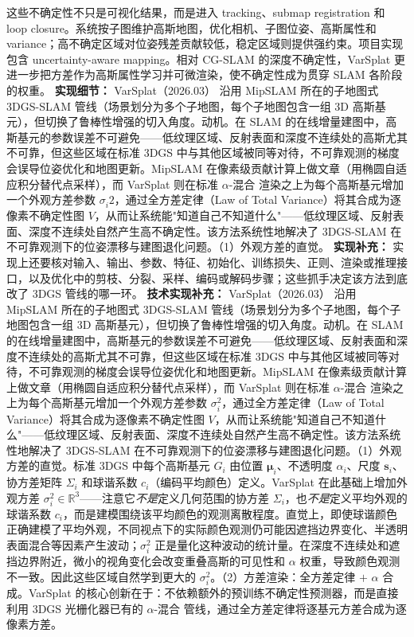 这些不确定性不只是可视化结果，而是进入 tracking、submap registration 和 loop closure。系统按子图维护高斯地图，优化相机、子图位姿、高斯属性和 variance；高不确定区域对位姿残差贡献较低，稳定区域则提供强约束。项目实现包含 uncertainty-aware mapping。相对 CG-SLAM 的深度不确定性，VarSplat 更进一步把方差作为高斯属性学习并可微渲染，使不确定性成为贯穿 SLAM 各阶段的权重。
\textbf{实现细节：} VarSplat（2026.03） 沿用 MipSLAM 所在的子地图式 3DGS-SLAM 管线（场景划分为多个子地图，每个子地图包含一组 3D 高斯基元），但切换了鲁棒性增强的切入角度。动机。在 SLAM 的在线增量建图中，高斯基元的参数误差不可避免——低纹理区域、反射表面和深度不连续处的高斯尤其不可靠，但这些区域在标准 3DGS 中与其他区域被同等对待，不可靠观测的梯度会误导位姿优化和地图更新。MipSLAM 在像素级贡献计算上做文章（用椭圆自适应积分替代点采样），而 VarSplat 则在标准 $\alpha$-混合 渲染之上为每个高斯基元增加一个外观方差参数 $\sigma_i^{}2$，通过全方差定律（Law of Total Variance）将其合成为逐像素不确定性图 $V$，从而让系统能"知道自己不知道什么"——低纹理区域、反射表面、深度不连续处自然产生高不确定性。该方法系统性地解决了 3DGS-SLAM 在不可靠观测下的位姿漂移与建图退化问题。（1）外观方差的直觉。
\textbf{实现补充：} 实现上还要核对输入、输出、参数、特征、初始化、训练损失、正则、渲染或推理接口，以及优化中的剪枝、分裂、采样、编码或解码步骤；这些抓手决定该方法到底改了 3DGS 管线的哪一环。
\textbf{技术实现补充：} VarSplat（2026.03） 沿用 MipSLAM 所在的子地图式 3DGS-SLAM 管线（场景划分为多个子地图，每个子地图包含一组 3D 高斯基元），但切换了鲁棒性增强的切入角度。动机。在 SLAM 的在线增量建图中，高斯基元的参数误差不可避免——低纹理区域、反射表面和深度不连续处的高斯尤其不可靠，但这些区域在标准 3DGS 中与其他区域被同等对待，不可靠观测的梯度会误导位姿优化和地图更新。MipSLAM 在像素级贡献计算上做文章（用椭圆自适应积分替代点采样），而 VarSplat 则在标准 $\alpha$-混合 渲染之上为每个高斯基元增加一个外观方差参数 $\sigma_i^2$，通过全方差定律（Law of Total Variance）将其合成为逐像素不确定性图 $V$，从而让系统能"知道自己不知道什么"——低纹理区域、反射表面、深度不连续处自然产生高不确定性。该方法系统性地解决了 3DGS-SLAM 在不可靠观测下的位姿漂移与建图退化问题。（1）外观方差的直觉。标准 3DGS 中每个高斯基元 $G_i$ 由位置 $\boldsymbol{\mu}_i$、不透明度 $\alpha_i$、尺度 $\mathbf{s}_i$、协方差矩阵 $\Sigma_i$ 和球谐系数 $c_i$（编码平均颜色）定义。VarSplat 在此基础上增加外观方差 $\sigma_i^2 \in \mathbb{R}^3$——注意它\textit{不是}定义几何范围的协方差 $\Sigma_i$，也\textit{不是}定义平均外观的球谐系数 $c_i$，而是建模围绕该平均颜色的观测离散程度。直觉上，即使球谐颜色正确建模了平均外观，不同视点下的实际颜色观测仍可能因遮挡边界变化、半透明表面混合等因素产生波动；$\sigma_i^2$ 正是量化这种波动的统计量。在深度不连续处和遮挡边界附近，微小的视角变化会改变重叠高斯的可见性和 $\alpha$ 权重，导致颜色观测不一致。因此这些区域自然学到更大的 $\sigma_i^2$。（2）方差渲染：全方差定律 $+$ $\alpha$ 合成。VarSplat 的核心创新在于：不依赖额外的预训练不确定性预测器，而是直接利用 3DGS 光栅化器已有的 $\alpha$-混合 管线，通过全方差定律将逐基元方差合成为逐像素方差。
